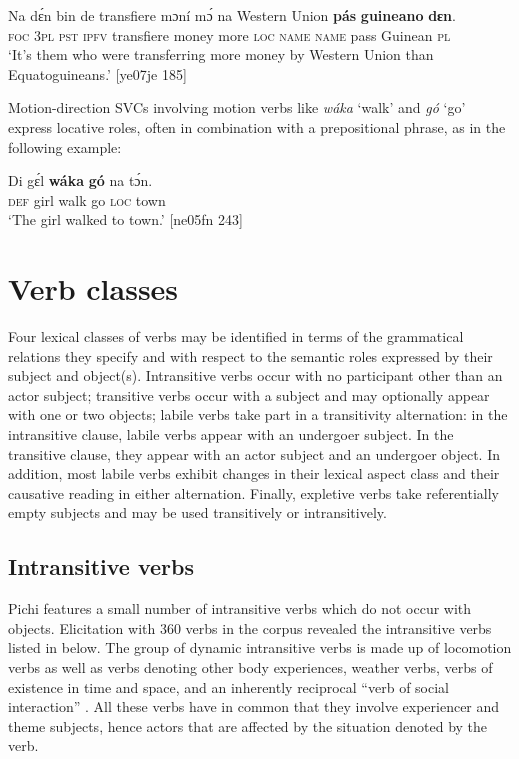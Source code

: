 \ea%
    \label{ex:key:1078}
    \gll Na  dɛ́n  bin  de  transfiere  mɔní  mɔ́    na  Western  Union
\textbf{pás}  \textbf{guineano}  \textbf{dɛn}.\\
\textsc{foc}  \textsc{3pl}  \textsc{pst}  \textsc{ipfv}  transfiere  money  more  \textsc{loc}  \textsc{name}  \textsc{name}
pass  Guinean    \textsc{pl}\\
\glt ‘It’s them who were transferring more money by Western Union
than Equatoguineans.’ [ye07je 185]
\z

Motion-direction SVCs involving motion verbs like \textit{wáka} ‘walk’ and \textit{gó} ‘go’ express locative roles, often in combination with a prepositional phrase, as in the following example: 


\ea%
    \label{ex:key:1079}
    \gll Di  gɛ́l    \textbf{wáka}  \textbf{gó}  na  tɔ́n.\\
\textsc{def}  girl    walk  go  \textsc{loc}  town\\

\glt ‘The girl walked to town.’ [ne05fn 243]
\z

\section{Verb classes}\label{sec:9.2}

Four lexical classes of verbs may be identified in terms of the grammatical relations they specify and with respect to the semantic roles expressed by their subject and object(s). Intransitive verbs occur with no participant other than an actor subject; transitive verbs occur with a subject and may optionally appear with one or two objects; labile verbs take part in a transitivity alternation: in the intransitive clause, labile verbs appear with an undergoer subject. In the transitive clause, they appear with an actor subject and an undergoer object. In addition, most labile verbs exhibit changes in their lexical aspect class and their causative reading in either alternation. Finally, expletive verbs take referentially empty subjects and may be used transitively or intransitively.

\subsection{Intransitive verbs}\label{sec:9.2.1}

Pichi features a small number of intransitive verbs which do not occur with objects. Elicitation with 360 verbs in the corpus revealed the intransitive verbs listed in  below. The group of dynamic intransitive verbs is made up of locomotion verbs as well as verbs denoting other body experiences, weather verbs, verbs of existence in time and space, and an inherently reciprocal “verb of social interaction” \citep[201]{Levin1993}. All these verbs have in common that they involve experiencer and theme subjects, hence actors that are affected by the situation denoted by the verb.

